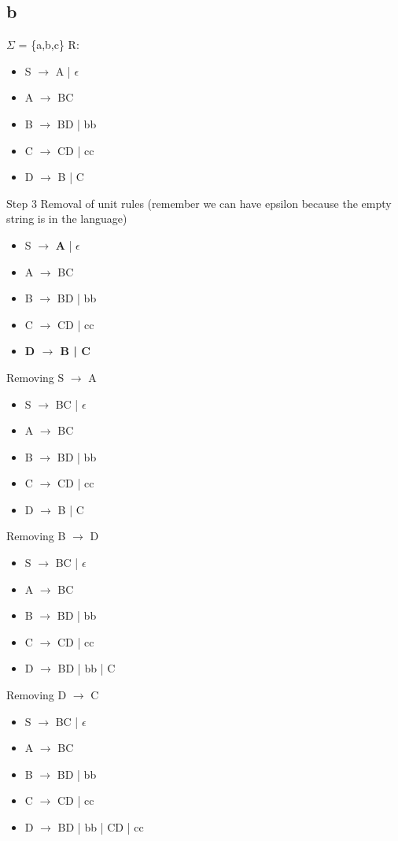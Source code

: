 \documentclass[11pt]{article}
\begin{document}
\subsection{b}
\label{sec:orgc7ca5dd}
\(\Sigma\) = \{a,b,c\}
R:
\begin{itemize}
\item S \(\rightarrow\) A | \(\epsilon\)
\item A \(\rightarrow\) BC
\item B \(\rightarrow\) BD | bb
\item C \(\rightarrow\) CD | cc
\item D \(\rightarrow\) B | C
\end{itemize}

Step 3 Removal of unit rules (remember we can have epsilon because the empty string is in the language)
\begin{itemize}
\item S \(\rightarrow\) \textbf{A} | \(\epsilon\)
\item A \(\rightarrow\) BC
\item B \(\rightarrow\) BD | bb
\item C \(\rightarrow\) CD | cc
\item \textbf{D \(\rightarrow\) B | C}
\end{itemize}

Removing S \(\rightarrow\) A
\begin{itemize}
\item S \(\rightarrow\) BC | \(\epsilon\)
\item A \(\rightarrow\) BC
\item B \(\rightarrow\) BD | bb
\item C \(\rightarrow\) CD | cc
\item D \(\rightarrow\) B | C
\end{itemize}

Removing B \(\rightarrow\) D
\begin{itemize}
\item S \(\rightarrow\) BC | \(\epsilon\)
\item A \(\rightarrow\) BC
\item B \(\rightarrow\) BD | bb
\item C \(\rightarrow\) CD | cc
\item D \(\rightarrow\) BD | bb | C
\end{itemize}

Removing D \(\rightarrow\) C
\begin{itemize}
\item S \(\rightarrow\) BC | \(\epsilon\)
\item A \(\rightarrow\) BC
\item B \(\rightarrow\) BD | bb
\item C \(\rightarrow\) CD | cc
\item D \(\rightarrow\) BD | bb | CD | cc
\end{itemize}
\end{document}
